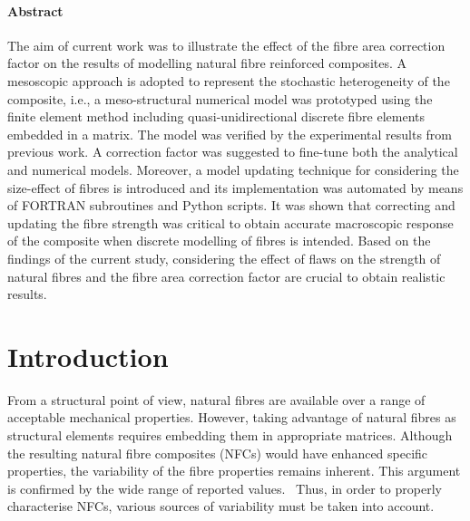 \paragraph{Abstract} The aim of current work was to illustrate the effect of the fibre area correction factor on the results of modelling natural fibre reinforced composites. A mesoscopic approach is adopted to represent the stochastic heterogeneity of the composite, i.e., a meso-structural numerical model was prototyped using the finite element method including quasi-unidirectional discrete fibre elements embedded in a matrix. The model was verified by the experimental results from previous work. A correction factor was suggested to fine-tune both the analytical and numerical models. Moreover, a model updating technique for considering the size-effect of fibres is introduced and its implementation was automated by means of FORTRAN subroutines and Python scripts. It was shown that correcting and updating the fibre strength was critical to obtain accurate macroscopic response of the composite when discrete modelling of fibres is intended. Based on the findings of the current study, considering the effect of flaws on the strength of natural fibres and the fibre area correction factor are crucial to obtain realistic results. 

\section{Introduction}
	From a structural point of view, natural fibres are available over a range of acceptable mechanical properties. However, taking advantage of natural fibres as structural elements requires embedding them in appropriate matrices. Although the resulting natural fibre composites (NFCs) would have enhanced specific properties, the variability of the fibre properties remains inherent. This argument is confirmed by the wide range of reported values.~\autocite{Pickering.2016} Thus, in order to properly characterise NFCs, various sources of variability must be taken into account.
	
